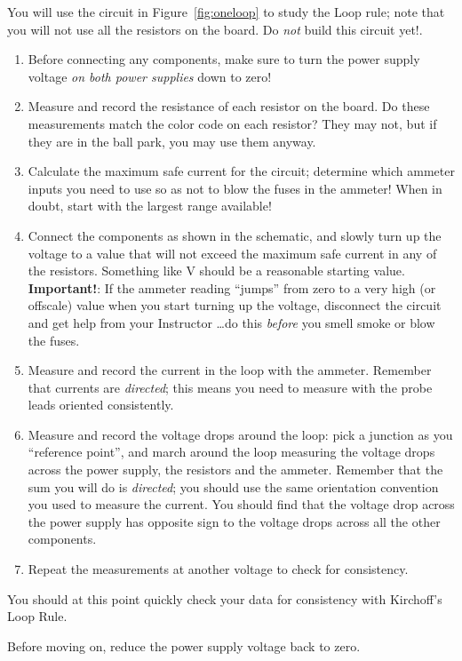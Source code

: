 \documentclass[12pt]{article}
\begin{document}
You will use the circuit in Figure~\ref{fig:oneloop} to study the Loop
rule; note that you will not use all the resistors on the board.  Do
\textit{not} build this circuit yet!.
\begin{enumerate}
\item Before connecting any components, make sure to turn the power
  supply voltage \textit{on both power supplies} down to zero!
\item Measure and record the resistance of each resistor on the
  board.  Do these measurements match the color code on each resistor?
  They may not, but if they are in the ball park, you may use them
  anyway. 
\item Calculate the maximum safe current for the circuit; determine
  which ammeter inputs you need to use so as not to blow the fuses in
  the ammeter!  When in doubt, start with the largest range available! 
\item Connect the components as shown in the schematic, and slowly
  turn up the voltage to a value that will not exceed the maximum safe
  current in any of the resistors.  Something like \unit[15]{V} should
  be a reasonable starting value.  \textbf{Important!}: If the ammeter
  reading ``jumps'' from zero to a very high (or offscale) value when
  you start turning up the voltage, disconnect the circuit and get
  help from your Instructor \ldots do this \textit{before} you smell
  smoke or blow the fuses.
\item Measure and record the current in the loop with the ammeter.
  Remember that currents are \textit{directed}; this means you need to
  measure with the probe leads oriented consistently.
\item Measure and record the voltage drops around the loop: pick a
  junction as you ``reference point'', and march around the loop
  measuring the voltage drops across the power supply, the resistors
  and the ammeter.  Remember that the sum you will do is
  \textit{directed}; you should use the same orientation convention
  you used to measure the current.  You should find that the voltage
  drop across the power supply has opposite sign to the voltage drops
  across all the other components.
\item Repeat the measurements at another voltage to check for
  consistency.
\end{enumerate}
You should at this point quickly check your data for consistency with
Kirchoff's Loop Rule.

Before moving on, reduce the power supply voltage back to zero.
\end{document}
